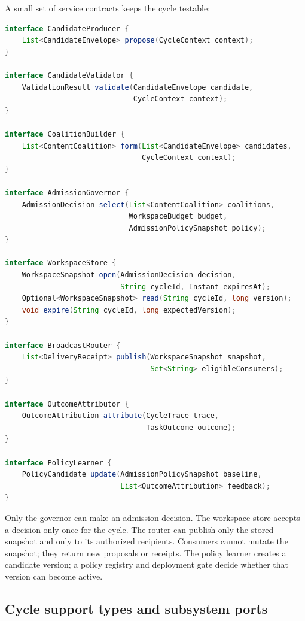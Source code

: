 A small set of service contracts keeps the cycle testable:
\begin{lstlisting}[language=Java,caption={Proposed workspace subsystem interfaces.},label={lst:ch14-workspace-interfaces}]
interface CandidateProducer {
    List<CandidateEnvelope> propose(CycleContext context);
}

interface CandidateValidator {
    ValidationResult validate(CandidateEnvelope candidate,
                              CycleContext context);
}

interface CoalitionBuilder {
    List<ContentCoalition> form(List<CandidateEnvelope> candidates,
                                CycleContext context);
}

interface AdmissionGovernor {
    AdmissionDecision select(List<ContentCoalition> coalitions,
                             WorkspaceBudget budget,
                             AdmissionPolicySnapshot policy);
}

interface WorkspaceStore {
    WorkspaceSnapshot open(AdmissionDecision decision,
                           String cycleId, Instant expiresAt);
    Optional<WorkspaceSnapshot> read(String cycleId, long version);
    void expire(String cycleId, long expectedVersion);
}

interface BroadcastRouter {
    List<DeliveryReceipt> publish(WorkspaceSnapshot snapshot,
                                  Set<String> eligibleConsumers);
}

interface OutcomeAttributor {
    OutcomeAttribution attribute(CycleTrace trace,
                                 TaskOutcome outcome);
}

interface PolicyLearner {
    PolicyCandidate update(AdmissionPolicySnapshot baseline,
                           List<OutcomeAttribution> feedback);
}
\end{lstlisting}

Only the governor can make an admission decision. The workspace store accepts a decision only once for the cycle. The router can publish only the stored snapshot and only to its authorized recipients. Consumers cannot mutate the snapshot; they return new proposals or receipts. The policy learner creates a candidate version; a policy registry and deployment gate decide whether that version can become active.

\subsection{Cycle support types and subsystem ports}

